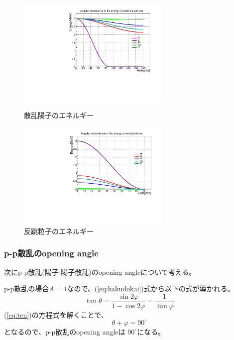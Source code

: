 \documentclass[a4paper,11pt,dvipdfmx]{jsarticle}
\begin{document}
\begin{figure}[bhtp]
  \begin{minipage}{0.5\hsize}
    \begin{center}
      \includegraphics[width=73mm]{picture/nonrelativity/newsca.pdf}
    \end{center}
    \caption{散乱陽子のエネルギー}
    \label{fig:scaene}
  \end{minipage}
  \begin{minipage}{0.5\hsize}
    \begin{center}
      \includegraphics[width=73mm]{picture/nonrelativity/recoil.pdf}
    \end{center}
    \caption{反跳粒子のエネルギー}
    \label{fig:recoil} 
  \end{minipage}
\end{figure}
\newpage
\subsubsection{p-p散乱のopening angle}\label{opening}
次にp-p散乱(陽子-陽子散乱)のopening angleについて考える。

p-p散乱の場合$A = 1$なので、(\ref{eq:kakudokai})式から以下の式が導かれる。
\begin{equation}\label{eq:ten}
\tan\theta = \frac{\sin2\varphi}{1 - \cos2\varphi} =\frac{1}{\tan\varphi}
\end{equation}
(\ref{eq:ten})の方程式を解くことで、
\begin{equation}
\theta + \varphi = 90^{\circ}
\end{equation}
となるので、p-p散乱のopening angleは $90^{\circ}$になる。
\end{document}

